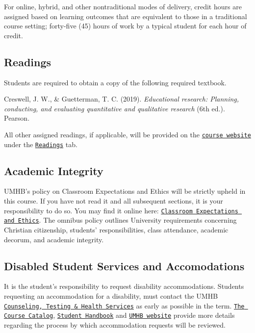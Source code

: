 \documentclass[
]{article}
\begin{document}
For online, hybrid, and other nontraditional modes of delivery, credit
hours are assigned based on learning outcomes that are equivalent to
those in a traditional course setting; forty-five (45) hours of work by
a typical student for each hour of credit.

\subsection{Readings}

Students are required to obtain a copy of the following required
textbook.

\begin{hangparas}{.4in}{1}
Creswell, J. W., \& Guetterman, T. C. (2019). {\em{Educational research: Planning, conducting, and evaluating quantitative and qualitative research}} (6th ed.). Pearson.
\end{hangparas}

All other assigned readings, if applicable, will be provided on the
\texttt{\href{https://mycourses.umhb.edu/courses/23592}{course website}}
under the
\texttt{\href{https://mycourses.umhb.edu/courses/23592/files/folder/Readings}{Readings}}
tab.

\subsection{Academic Integrity}

UMHB's policy on Classroom Expectations and Ethics will be strictly
upheld in this course. If you have not read it and all subsequent
sections, it is your responsibility to do so. You may find it online
here:
\href{http://catalog.umhb.edu/2019-2020/Graduate-Catalog/Classroom-Expectations-and-Ethics}{\texttt{Classroom Expectations and Ethics}}.
The omnibus policy outlines University requirements concerning Christian
citizenship, students' responsibilities, class attendance, academic
decorum, and academic integrity.

\subsection{Disabled Student Services and Accomodations}

It is the student's responsibility to request disability accommodations.
Students requesting an accommodation for a disability, must contact the
UMHB
\href{http://cths.umhb.edu/disability}{\texttt{Counseling, Testing \& Health Services}}
as early as possible in the term.
\href{http://catalog.umhb.edu/en/2019-2020/Graduate-Catalog}{\texttt{The Course Catalog}},
\href{http://students.umhb.edu/student-handbook}{\texttt{Student Handbook}}
and \href{https://go.umhb.edu/}{\texttt{UMHB website}} provide more
details regarding the process by which accommodation requests will be
reviewed.
\end{document}
